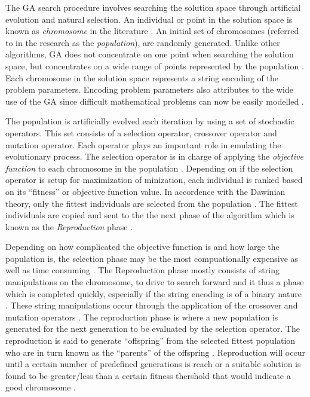 The GA search procedure involves searching the solution space through artificial evolution and natural selection\cite{FamilyGA,MultiPopGA,HybridIntelliGA}. An individual or point in the solution space is known as \emph{chromosome} in the literature \cite{HumanPassiveGA}. An initial set of chromosomes (referred to in the research as the \emph{population}), are randomly generated\cite{FamilyGA,HybridIntelliGA,AcceleratingGA,MultiPopGA}. Unlike other algorithms, GA does not concentrate on one point when searching the solution space, but concentrates on a wide range of points represented by the population \cite{DistributedHierarchicalGA,FamilyGA,HybridIntelliGA}. Each chromosome in the solution space represents a string encoding of the problem parameters\cite{FamilyGA}. Encoding problem parameters also attributes to the wide use of the GA since difficult mathematical problems can now be easily modelled \cite{AcceleratingGA}.

The population is artificially evolved each iteration by using a set of stochastic operators\cite{SelfAdaptiveGA}. This set consists of a selection operator, crossover operator and mutation operator\cite{SelfAdaptiveGA,MultiPopGA}. Each operator plays an important role in emulating the evolutionary process. The selection operator is in charge of applying the \emph{objective function} to each chromosome in the population \cite{AdaptiveSAGA,HumanPassiveGA}. Depending on if the selection operator is setup for maximization of minization, each individual is ranked based on its ``fitness'' or objective function value. In accordence with the Dawinian theory, only the fittest individuals are selected from the population \cite{HumanPassiveGA}. The fittest individuals are copied and sent to the the next phase of the algorithm which is known as the \emph{Reproduction} phase \cite{HumanPassiveGA}.

Depending on how complicated the objective function is and how large the population is, the selection phase may be the most compuationally expensive as well as time consuming \cite{AcceleratingGA}. The Reproduction phase mostly consists of string manipulations on the chromosome, to drive to search forward and it thus a phase which is completed quickly, especially if the string encoding is of a binary nature \cite{AcceleratingGA,AdaptiveSAGA}. These string manipulations occur through the application of the crossover and mutation operators \cite{ConstrainedGA}. The reproduction phase is where a new population is generated for the next generation to be evaluated by the selection operator. The reproduction is said to generate ``offspring'' from the selected fittest population who are in turn known as the ``parents'' of the offspring \cite{HumanPassiveGA,ConstrainedGA}. Reproduction will occur until a certain number of predefined generations is reach or a suitable solution is found to be greater/less than a certain fitness thershold that would indicate a good chromosome \cite{GATSP}.

